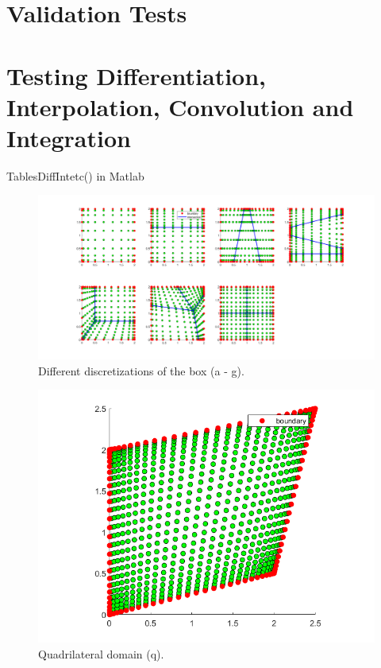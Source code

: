 \documentclass[11pt, a4paper]{article}
\theoremstyle{definition}
\begin{document}
\section*{Validation Tests}


\section{Testing Differentiation, Interpolation, Convolution and Integration}
TablesDiffIntetc() in Matlab
	\begin{figure}[h]
	\centering
	\includegraphics[scale=0.35]{BoxSections.png}
	\caption{Different discretizations of the box (a - g).} 
	\label{F2}
\end{figure}
\begin{figure}[h]
	\centering
	\includegraphics[scale=0.35]{quad.png}
	\caption{Quadrilateral domain (q).} 
	\label{F3a}
\end{figure}
\end{document}
